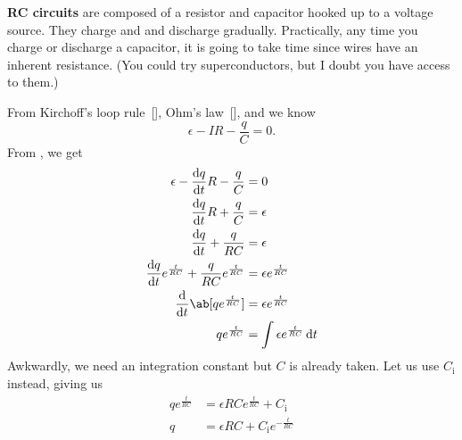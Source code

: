 \textbf{RC circuits} are composed of a resistor and capacitor
hooked up to a voltage source.
They charge and and discharge gradually.
Practically, any time you charge or discharge a capacitor,
it is going to take time since wires have an inherent resistance.
(You could try superconductors, but I doubt you have access to them.)

From Kirchoff's loop rule~[],
Ohm's law~[], and  we know
\begin{equation}
    \epsilon - I R - \frac{q}{C} = 0.
\end{equation}
From , we get
\begin{equation}
    \begin{aligned}
        \epsilon - \odv{q}{t} R - \frac{q}{C} &= 0 \\
        \odv{q}{t} R + \frac{q}{C} &= \epsilon \\
        \odv{q}{t} + \frac{q}{R C} &= \epsilon \\
        \odv{q}{t} e^{\frac{t}{R C}}
        + \frac{q}{R C} e^{\frac{t}{R C}}
        &= \epsilon e^{\frac{t}{R C}} \\
        \odv{}{t} \ab[q e^{\frac{t}{R C}}] &= \epsilon e^{\frac{t}{R C}} \\
        q e^{\frac{t}{R C}} &= \int \epsilon e^{\frac{t}{R C}} \odif{t}
    \end{aligned}
\end{equation}
Awkwardly, we need an integration constant but \(C\) is already taken.
Let us use \(C_\mathrm{i}\) instead, giving us
\begin{equation}
    \begin{aligned}
        q e^{\frac{t}{R C}} &=  \epsilon R C e^{\frac{t}{R C}} + C_\mathrm{i} \\
        q &=  \epsilon R C + C_\mathrm{i} e^{- \frac{t}{R C}} \\
    \end{aligned}
\end{equation}
